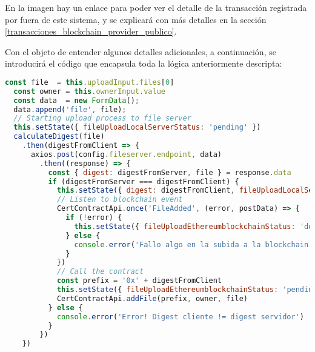 En la imagen hay un enlace para poder ver el detalle de la transacción registrada por fuera de este sistema, y se explicará con más detalles en la sección \ref{transacciones_blockchain_provider_publico}.

Con el objeto de entender algunos detalles adicionales, a continuación, se introducirá el código que encapsula toda la lógica anteriormente descripta:

\begin{minipage}{\linewidth}
\begin{lstlisting}[frame=single, belowskip=1em, aboveskip=2em,  language=javascript, captionpos=b, caption=Código de alta de certificación, label={lst:alta_certificacion}]
  const file  = this.uploadInput.files[0]
  const owner = this.ownerInput.value
  const data  = new FormData();
  data.append('file', file);
  // Starting upload process to file server
  this.setState({ fileUploadLocalServerStatus: 'pending' })
  calculateDigest(file)
    .then(digestFromClient => {
      axios.post(config.fileserver.endpoint, data)
        .then((response) => {
          const { digest: digestFromServer, file } = response.data
          if (digestFromServer === digestFromClient) {
            this.setState({ digest: digestFromClient, fileUploadLocalServerStatus: 'done' })
            // Listen to blockchain event
            CertContractApi.once('FileAdded', (error, postData) => {
              if (!error) {
                this.setState({ fileUploadEthereumblockchainStatus: 'done', txHash: postData.transactionHash })
              } else {
                console.error('Fallo algo en la subida a la blockchain de Ethereum')
              }
            })
            // Call the contract
            const prefix = '0x' + digestFromClient
            this.setState({ fileUploadEthereumblockchainStatus: 'pending' })
            CertContractApi.addFile(prefix, owner, file)
          } else {
            console.error('Error! Digest cliente != digest servidor')
          }
        })
    })
\end{lstlisting}
\end{minipage}

